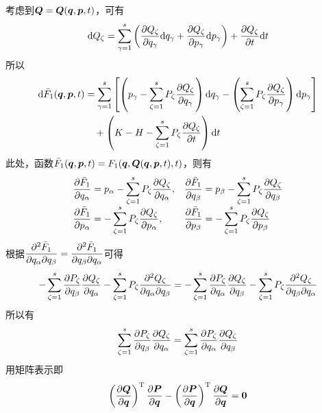 考虑到$\boldsymbol{Q} = \boldsymbol{Q}(\boldsymbol{q},\boldsymbol{p},t)$，可有
\begin{equation*}
	\mathrm{d} Q_\zeta = \sum_{\gamma=1}^s \left(\frac{\partial Q_\zeta}{\partial q_\gamma} \mathrm{d} q_\gamma + \frac{\partial Q_\zeta}{\partial p_\gamma} \mathrm{d} p_\gamma\right) + \frac{\partial Q_\zeta}{\partial t} \mathrm{d} t
\end{equation*}
所以
\begin{align*}
	\mathrm{d} \bar{F}_1(\boldsymbol{q},\boldsymbol{p},t) & = \sum_{\gamma=1}^s \left[\left(p_\gamma - \sum_{\zeta=1}^s P_\zeta \frac{\partial Q_\zeta}{\partial q_\gamma}\right) \mathrm{d} q_\gamma - \left(\sum_{\zeta=1}^s P_\zeta \frac{\partial Q_\zeta}{\partial p_\gamma}\right) \mathrm{d} p_\gamma\right] \\
	& \quad {}+ \left(K-H - \sum_{\zeta=1}^s P_\zeta \frac{\partial Q_\zeta}{\partial t}\right) \mathrm{d} t
\end{align*}
此处，函数$\bar{F}_1(\boldsymbol{q},\boldsymbol{p},t) = F_1(\boldsymbol{q},\boldsymbol{Q}(\boldsymbol{q},\boldsymbol{p},t),t)$，则有
\begin{equation*}
\begin{array}{ll}
	\displaystyle \frac{\partial \bar{F}_1}{\partial q_\alpha} = p_\alpha - \sum_{\zeta=1}^s P_\zeta \frac{\partial Q_\zeta}{\partial q_\alpha}, & \displaystyle \frac{\partial \bar{F}_1}{\partial q_\beta} = p_\beta - \sum_{\zeta=1}^s P_\zeta \frac{\partial Q_\zeta}{\partial q_\beta} \\[1.5ex]
	\displaystyle \frac{\partial \bar{F}_1}{\partial p_\alpha} = -\sum_{\zeta=1}^s P_\zeta \frac{\partial Q_\zeta}{\partial p_\alpha}, & \displaystyle \frac{\partial \bar{F}_1}{\partial p_\beta} = -\sum_{\zeta=1}^s P_\zeta \frac{\partial Q_\zeta}{\partial p_\beta}
\end{array}
\end{equation*}
根据$\dfrac{\partial^2 \bar{F}_1}{\partial q_\alpha \partial q_\beta} = \dfrac{\partial^2 \bar{F}_1}{\partial q_\beta \partial q_\alpha}$可得
\begin{equation*}
	-\sum_{\zeta=1}^s \frac{\partial P_\zeta}{\partial q_\beta} \frac{\partial Q_\zeta}{\partial q_\alpha} - \sum_{\zeta=1}^s P_\zeta \frac{\partial^2 Q_\zeta}{\partial q_\alpha \partial q_\beta} = -\sum_{\zeta=1}^s \frac{\partial P_\zeta}{\partial q_\alpha} \frac{\partial Q_\zeta}{\partial q_\beta} - \sum_{\zeta=1}^s P_\zeta \frac{\partial^2 Q_\zeta}{\partial q_\beta \partial q_\alpha}
\end{equation*}
所以有
\begin{equation*}
	\sum_{\zeta=1}^s \frac{\partial P_\zeta}{\partial q_\beta} \frac{\partial Q_\zeta}{\partial q_\alpha} = \sum_{\zeta=1}^s \frac{\partial P_\zeta}{\partial q_\alpha} \frac{\partial Q_\zeta}{\partial q_\beta}
\end{equation*}
用矩阵表示即
\begin{equation}
	\left(\frac{\partial \boldsymbol{Q}}{\partial \boldsymbol{q}}\right)^{\mathrm{T}} \frac{\partial \boldsymbol{P}}{\partial \boldsymbol{q}} - \left(\frac{\partial \boldsymbol{P}}{\partial \boldsymbol{q}}\right)^{\mathrm{T}} \frac{\partial \boldsymbol{Q}}{\partial \boldsymbol{q}} = \boldsymbol{0}
	\label{正则变换的矩阵表示1}
\end{equation}
